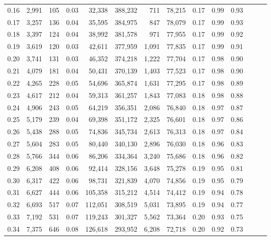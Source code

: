 \begin{tabular}{rrrrrrrrrrrrrr}
0.16 &  2,991 &    105 &  0.03 &   32,338 &  388,232 &     711 &  78,215 &  0.17 &  0.99 &      0.93 \\
0.17 &  3,257 &    136 &  0.04 &   35,595 &  384,975 &     847 &  78,079 &  0.17 &  0.99 &      0.93 \\
0.18 &  3,397 &    124 &  0.04 &   38,992 &  381,578 &     971 &  77,955 &  0.17 &  0.99 &      0.92 \\
0.19 &  3,619 &    120 &  0.03 &   42,611 &  377,959 &   1,091 &  77,835 &  0.17 &  0.99 &      0.91 \\
0.20 &  3,741 &    131 &  0.03 &   46,352 &  374,218 &   1,222 &  77,704 &  0.17 &  0.98 &      0.90 \\
0.21 &  4,079 &    181 &  0.04 &   50,431 &  370,139 &   1,403 &  77,523 &  0.17 &  0.98 &      0.90 \\
0.22 &  4,265 &    228 &  0.05 &   54,696 &  365,874 &   1,631 &  77,295 &  0.17 &  0.98 &      0.89 \\
0.23 &  4,617 &    212 &  0.04 &   59,313 &  361,257 &   1,843 &  77,083 &  0.18 &  0.98 &      0.88 \\
0.24 &  4,906 &    243 &  0.05 &   64,219 &  356,351 &   2,086 &  76,840 &  0.18 &  0.97 &      0.87 \\
0.25 &  5,179 &    239 &  0.04 &   69,398 &  351,172 &   2,325 &  76,601 &  0.18 &  0.97 &      0.86 \\
0.26 &  5,438 &    288 &  0.05 &   74,836 &  345,734 &   2,613 &  76,313 &  0.18 &  0.97 &      0.84 \\
0.27 &  5,604 &    283 &  0.05 &   80,440 &  340,130 &   2,896 &  76,030 &  0.18 &  0.96 &      0.83 \\
0.28 &  5,766 &    344 &  0.06 &   86,206 &  334,364 &   3,240 &  75,686 &  0.18 &  0.96 &      0.82 \\
0.29 &  6,208 &    408 &  0.06 &   92,414 &  328,156 &   3,648 &  75,278 &  0.19 &  0.95 &      0.81 \\
0.30 &  6,317 &    422 &  0.06 &   98,731 &  321,839 &   4,070 &  74,856 &  0.19 &  0.95 &      0.79 \\
0.31 &  6,627 &    444 &  0.06 &  105,358 &  315,212 &   4,514 &  74,412 &  0.19 &  0.94 &      0.78 \\
0.32 &  6,693 &    517 &  0.07 &  112,051 &  308,519 &   5,031 &  73,895 &  0.19 &  0.94 &      0.77 \\
0.33 &  7,192 &    531 &  0.07 &  119,243 &  301,327 &   5,562 &  73,364 &  0.20 &  0.93 &      0.75 \\
0.34 &  7,375 &    646 &  0.08 &  126,618 &  293,952 &   6,208 &  72,718 &  0.20 &  0.92 &      0.73 \\

\end{tabular}
